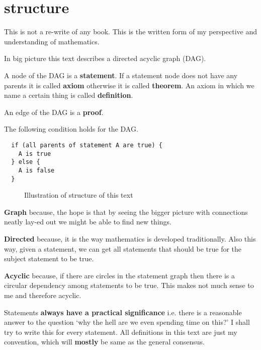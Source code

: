 \documentclass[./main.tex]{subfiles}
\begin{document}
\section{structure}
This is not a re-write of any book.
This is the written form of my perspective and understanding of mathematics.

In big picture this text describes a directed acyclic graph (DAG).

A node of the DAG is a \textbf{statement}.
If a statement node does not have any parents it is called \textbf{axiom} otherwise it is called \textbf{theorem}. An axiom in which we name a certain thing is called \textbf{definition}.

An edge of the DAG is a \textbf{proof}.

The following condition holds for the DAG.
\begin{verbatim}
  if (all parents of statement A are true) {
    A is true
  } else {
    A is false
  }
\end{verbatim}

\begin{figure}[h]
	\centering
	\caption{Illustration of structure of this text}
	\label{fig:structure_of_text}
\end{figure}

\textbf{Graph} because, the hope is that by seeing the bigger picture with connections neatly lay-ed out we might be able to find new things.

\textbf{Directed} because, it is the way mathematics is developed traditionally. Also this way, given a statement, we can get all statements that should be true for the subject statement to be true.

\textbf{Acyclic} because, if there are circles in the statement graph then there is a circular dependency among statements to be true.
This makes not much sense to me and therefore acyclic.

Statements \textbf{always have a practical significance} i.e. there is a reasonable answer to the question `why the hell are we even spending time on this?' I shall try to write this for every statement. All definitions in this text are just my convention, which will \textbf{mostly} be same as the general consensus.

\pagebreak
\end{document}
